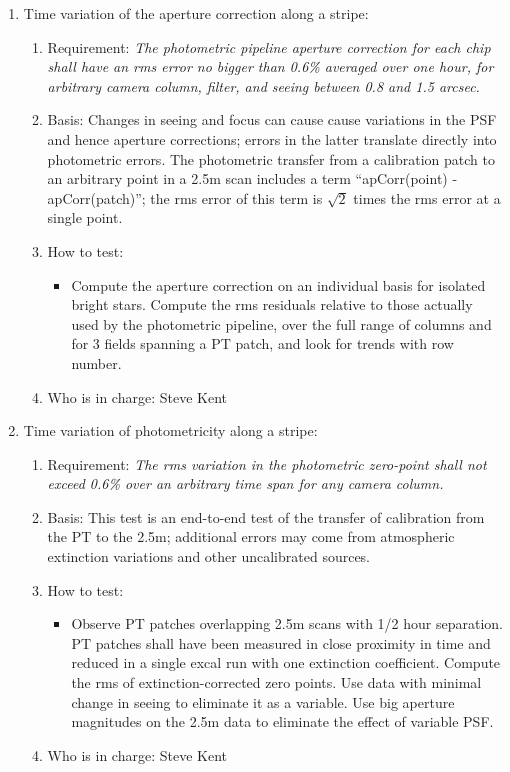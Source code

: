 \begin{enumerate}
\item Time variation of the aperture correction along a stripe:
   \begin{enumerate}
   \item Requirement: {\it The photometric pipeline aperture
	correction for each chip shall have an rms error no bigger than
	0.6\% averaged over one hour, for arbitrary camera column,
	filter, 
	and seeing between 0.8 and 1.5 arcsec.} 
   \item Basis: Changes in seeing and focus can cause cause variations
	in the PSF and hence aperture corrections; errors in the
	latter translate directly into photometric errors.  The
	photometric transfer from a calibration patch to an arbitrary
	point in a 2.5m scan includes a term ``apCorr(point) -
	apCorr(patch)''; the rms error of this term is $\sqrt{2}$
	times the rms error at a single point.  
   \item How to test:
	\begin{itemize}
	\item Compute the aperture correction on an individual basis for isolated bright
	   stars.  Compute the rms residuals relative to those
	   actually used by the photometric pipeline, over the full
	   range of columns and for 3 fields spanning a PT patch, and
	   look for trends with row number. 
	\end{itemize}
   \item Who is in charge: Steve Kent
   \end{enumerate}

\item Time variation of photometricity along a stripe:
   \begin{enumerate}
   \item Requirement: {\it The rms variation in the photometric
zero-point shall
	not exceed 0.6\% over an arbitrary time span for any camera column.}
   \item Basis:  This test is an end-to-end test of the transfer of
calibration from the PT to the 2.5m; additional errors may come from
atmospheric extinction variations and other uncalibrated sources.
   \item How to test:
	\begin{itemize}
	\item Observe PT patches overlapping 2.5m scans with
	   1/2 hour separation.  PT patches shall have been measured in close
	   proximity in time and reduced in a single excal run with one extinction
	   coefficient.  Compute the rms of extinction-corrected zero points.
	   Use data with minimal change in seeing to eliminate it as a
	   variable.  Use big aperture magnitudes on the 2.5m data to
	   eliminate the effect of variable PSF. 
	\end{itemize}
   \item Who is in charge: Steve Kent
   \end{enumerate}


\end{enumerate}
